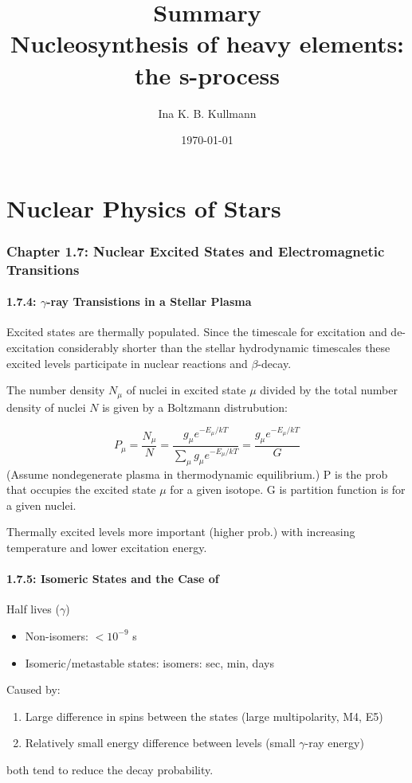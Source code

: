 \documentclass[a4paper,12pt]{article}
\title{\Huge{\textbf{Summary}} \\ \Large{Nucleosynthesis of heavy elements: the s-process}}
\author{Ina K. B. Kullmann}
\date{\today}
\begin{document}
\maketitle
\part{Nuclear Physics of Stars}
\section*{Chapter 1.7: Nuclear Excited States and Electromagnetic Transitions}
\subsection*{1.7.4: $\gamma$-ray Transistions in a Stellar Plasma}
Excited states are thermally populated. Since the timescale for excitation and de-excitation considerably shorter than the stellar hydrodynamic timescales these excited levels participate in nuclear reactions and $\beta$-decay. 

The number density $N_{\mu}$ of nuclei in excited state $\mu$ divided by the total number density of nuclei $N$ is given by a Boltzmann distrubution:

\begin{equation}
P_\mu = \frac{N_\mu}{N} = \frac{g_\mu e^{-E_\mu/kT}}{\sum_\mu g_\mu e^{-E_\mu/kT}} = \frac{g_\mu e^{-E_\mu/kT}}{G}
\end{equation}
(Assume nondegenerate plasma in thermodynamic equilibrium.)
P is the prob that occupies the excited state $\mu$ for a given isotope. G is partition function is for a given nuclei. 

Thermally excited levels more important (higher prob.) with increasing temperature and lower excitation energy. 

\subsection*{1.7.5: Isomeric States and the Case of }
Half lives ($\gamma$) 
\begin{itemize}
\item Non-isomers: $< 10^{-9}$ s
\item Isomeric/metastable states: isomers: sec, min, days
\end{itemize}

Caused by:
\begin{enumerate}
\item Large difference in spins between the states (large multipolarity, M4, E5)
\item Relatively small energy difference between levels (small $\gamma$-ray energy)
\end{enumerate}
both tend to reduce the decay probability.
\end{document}
